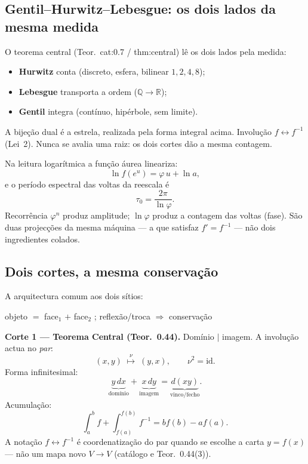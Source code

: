 \documentclass[11pt,a4paper]{article}
\begin{document}
\subsection{Gentil--Hurwitz--Lebesgue: os dois lados da mesma medida}

O teorema central (Teor.~cat:0.7 / thm:central) lê os dois lados pela medida:

\begin{itemize}[leftmargin=1.2em,itemsep=1pt]
  \item \textbf{Hurwitz} conta (discreto, esfera, bilinear $1,2,4,8$);
  \item \textbf{Lebesgue} transporta a ordem ($\mathbb{Q}\to\mathbb{R}$);
  \item \textbf{Gentil} integra (contínuo, hipérbole, sem limite).
\end{itemize}

A bijeção dual é a estrela, realizada pela forma integral acima.
Involução $f\leftrightarrow f^{-1}$ (Lei~2). Nunca se avalia uma raiz: os dois cortes
dão a mesma contagem.

Na leitura logarítmica a função áurea lineariza:
\[
\ln f(e^u)=\varphi\,u+\ln a,
\]
e o período espectral das voltas da reescala é
\[
\tau_0=\frac{2\pi}{\ln\varphi}.
\]
Recorrência $\varphi^n$ produz amplitude; $\ln\varphi$ produz a contagem das voltas (fase).
São duas projecções da mesma máquina --- a que satisfaz $f'=f^{-1}$ --- não dois
ingredientes colados.

\subsection{Dois cortes, a mesma conservação}

A arquitectura comum aos dois sítios:

\begin{center}
objeto $=$ face$_1$ $+$ face$_2$
\qquad;\qquad
reflexão/troca $\Longrightarrow$ conservação
\end{center}

\textbf{Corte 1 --- Teorema Central (Teor.~0.44).}
Domínio $\mid$ imagem. A involução actua no \emph{par}:
\[
(x,y)\;\overset{\nu}{\longmapsto}\;(y,x),\qquad \nu^2=\mathrm{id}.
\]
Forma infinitesimal:
\[
\underbrace{y\,dx}_{\text{domínio}}+\underbrace{x\,dy}_{\text{imagem}}=\underbrace{d(xy)}_{\text{vinco/fecho}}.
\]
Acumulação:
\[
\int_a^b f+\int_{f(a)}^{f(b)}f^{-1}=bf(b)-af(a).
\]
A notação $f\leftrightarrow f^{-1}$ é coordenatização do par quando se escolhe a carta $y=f(x)$
--- não um mapa novo $V\to V$ (catálogo e Teor.~0.44(3)).
\end{document}
